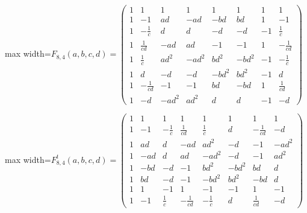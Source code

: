 \documentclass[11pt,a4paper]{article}
\theoremstyle{plain}
\theoremstyle{definition}
\numberwithin{equation}{section}
\begin{document}
\begin{center}\normalsize\setlength{\arraycolsep}{3.8pt}
\begin{adjustbox}{max width=\textwidth}$\displaystyle F_{8,4}(a,b,c,d)=\begin{pmatrix}
1 & 1 & 1 & 1 & 1 & 1 & 1 & 1 \\
1 & -1 & ad & -ad & -bd & bd & 1 & -1 \\
1 & -\frac{1}{c} & d & d & -d & -d & -1 & \frac{1}{c} \\
1 & \frac{1}{cd} & -ad & ad & -1 & -1 & 1 & -\frac{1}{cd} \\
1 & \frac{1}{c} & ad^{2} & -ad^{2} & bd^{2} & -bd^{2} & -1 & -\frac{1}{c} \\
1 & d & -d & -d & -bd^{2} & bd^{2} & -1 & d \\
1 & -\frac{1}{cd} & -1 & -1 & bd & -bd & 1 & \frac{1}{cd} \\
1 & -d & -ad^{2} & ad^{2} & d & d & -1 & -d
\end{pmatrix}$\end{adjustbox}
\end{center}

\begin{center}\normalsize\setlength{\arraycolsep}{3.8pt}
\begin{adjustbox}{max width=\textwidth}$\displaystyle F_{8,4}^{t}(a,b,c,d)=\begin{pmatrix}
1 & 1 & 1 & 1 & 1 & 1 & 1 & 1 \\
1 & -1 & -\frac{1}{c} & \frac{1}{cd} & \frac{1}{c} & d & -\frac{1}{cd} & -d \\
1 & ad & d & -ad & ad^{2} & -d & -1 & -ad^{2} \\
1 & -ad & d & ad & -ad^{2} & -d & -1 & ad^{2} \\
1 & -bd & -d & -1 & bd^{2} & -bd^{2} & bd & d \\
1 & bd & -d & -1 & -bd^{2} & bd^{2} & -bd & d \\
1 & 1 & -1 & 1 & -1 & -1 & 1 & -1 \\
1 & -1 & \frac{1}{c} & -\frac{1}{cd} & -\frac{1}{c} & d & \frac{1}{cd} & -d
\end{pmatrix}$\end{adjustbox}
\end{center}
\end{document}
